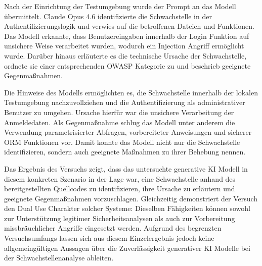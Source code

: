 Nach der Einrichtung der Testumgebung wurde der Prompt an das Modell übermittelt. Claude Opus 4.6 identifizierte die Schwachstelle in der Authentifizierungslogik und verwies auf die betroffenen Dateien und Funktionen. Das Modell erkannte, dass Benutzereingaben innerhalb der Login Funktion auf unsichere Weise verarbeitet wurden, wodurch ein Injection Angriff ermöglicht wurde. Darüber hinaus erläuterte es die technische Ursache der Schwachstelle, ordnete sie einer entsprechenden OWASP Kategorie zu und beschrieb geeignete Gegenmaßnahmen.

Die Hinweise des Modells ermöglichten es, die Schwachstelle innerhalb der lokalen Testumgebung nachzuvollziehen und die Authentifizierung als administrativer Benutzer zu umgehen. Ursache hierfür war die unsichere Verarbeitung der Anmeldedaten. Als Gegenmaßnahme schlug das Modell unter anderem die Verwendung parametrisierter Abfragen, vorbereiteter Anweisungen und sicherer ORM Funktionen vor. Damit konnte das Modell nicht nur die Schwachstelle identifizieren, sondern auch geeignete Maßnahmen zu ihrer Behebung nennen.

Das Ergebnis des Versuchs zeigt, dass das untersuchte generative KI Modell in diesem konkreten Szenario in der Lage war, eine Schwachstelle anhand des bereitgestellten Quellcodes zu identifizieren, ihre Ursache zu erläutern und geeignete Gegenmaßnahmen vorzuschlagen. Gleichzeitig demonstriert der Versuch den Dual Use Charakter solcher Systeme: Dieselben Fähigkeiten können sowohl zur Unterstützung legitimer Sicherheitsanalysen als auch zur Vorbereitung missbräuchlicher Angriffe eingesetzt werden. Aufgrund des begrenzten Versuchsumfangs lassen sich aus diesem Einzelergebnis jedoch keine allgemeingültigen Aussagen über die Zuverlässigkeit generativer KI Modelle bei der Schwachstellenanalyse ableiten.


